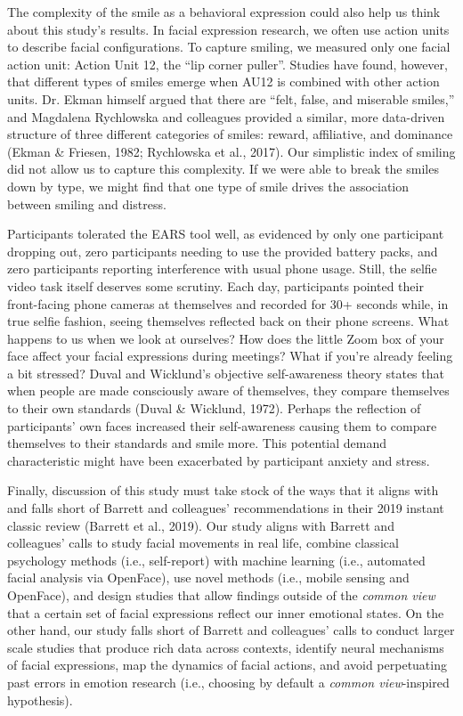 \documentclass[authordate, empirical]{jote-new-article}
\begin{document}
The complexity of the smile as a behavioral expression could also help us think about this study's results. In facial expression research, we often use action units to describe facial configurations. To capture smiling, we measured only one facial action unit: Action Unit 12, the “lip corner puller”. Studies have found, however, that different types of smiles emerge when AU12 is combined with other action units. Dr. Ekman himself argued that there are “felt, false, and miserable smiles,” and Magdalena Rychlowska and colleagues provided a similar, more data-driven structure of three different categories of smiles: reward, affiliative, and dominance (Ekman \& Friesen, 1982; Rychlowska et al., 2017). Our simplistic index of smiling did not allow us to capture this complexity. If we were able to break the smiles down by type, we might find that one type of smile drives the association between smiling and distress.



Participants tolerated the EARS tool well, as evidenced by only one participant dropping out, zero participants needing to use the provided battery packs, and zero participants reporting interference with usual phone usage. Still, the selfie video task itself deserves some scrutiny. Each day, participants pointed their front-facing phone cameras at themselves and recorded for 30+ seconds while, in true selfie fashion, seeing themselves reflected back on their phone screens. What happens to us when we look at ourselves? How does the little Zoom box of your face affect your facial expressions during meetings? What if you're already feeling a bit stressed? Duval and Wicklund's objective self-awareness theory states that when people are made consciously aware of themselves, they compare themselves to their own standards (Duval \& Wicklund, 1972). Perhaps the reflection of participants' own faces increased their self-awareness causing them to compare themselves to their standards and smile more. This potential demand characteristic might have been exacerbated by participant anxiety and stress.



Finally, discussion of this study must take stock of the ways that it aligns with and falls short of Barrett and colleagues' recommendations in their 2019 instant classic review (Barrett et al., 2019). Our study aligns with Barrett and colleagues' calls to study facial movements in real life, combine classical psychology methods (i.e., self-report) with machine learning (i.e., automated facial analysis via OpenFace), use novel methods (i.e., mobile sensing and OpenFace), and design studies that allow findings outside of the \emph{common view} that a certain set of facial expressions reflect our inner emotional states. On the other hand, our study falls short of Barrett and colleagues' calls to conduct larger scale studies that produce rich data across contexts, identify neural mechanisms of facial expressions, map the dynamics of facial actions, and avoid perpetuating past errors in emotion research (i.e., choosing by default a \emph{common view}-inspired hypothesis).
\end{document}
